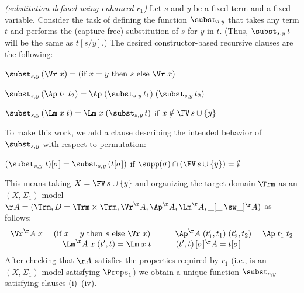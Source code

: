 \begin{exa}\rm
	\textit{(substitution defined using enhanced $r_1$)}  \cite{pitts-AlphaStructural} 
	Let $s$ and $y$ be a fixed term and a fixed variable. 
	Consider the task of defining the function $\subst_{s,y}$ that takes any term $t$ and performs the (capture-free) 
	substitution of $s$ for $y$ in $t$. 
	(Thus, $\subst_{s,y}\,t$ will be the same as $t[s/y]$.)
		The desired constructor-based recursive clauses are the following: 
	\begin{myitem}
		\item[(i)] $\subst_{s,y}\,(\Vr\;x)= (\mbox{if $x=y$ then $s$ else $\Vr\;x$})$
	    \item[(ii)] $\subst_{s,y}\,(\Ap\;t_1\;t_2) = \Ap\;(\subst_{s,y}\,t_1)\;(\subst_{s,y}\,t_2)$
		\item[(iii)] 
		$\subst_{s,y}\,(\Lm\;x\;t) = \Lm\;x\;(\subst_{s,y}\,t)$ if $x\notin \FV\,s \cup \{y\}$ 
	\end{myitem}
	To make this work, %
	we add a clause describing the intended behavior of $\subst_{s,y}$ with respect to permutation: %
	\begin{myitem}
		\item[(iv)] $(\subst_{s,y}\;t)[\sigma] = 
		\subst_{s,y}\,(t[\sigma])$ if $\supp(\sigma) \cap (\FV\,s \cup \{y\})= \emptyset$ 
	\end{myitem}
	
	This means taking $X = \FV\,s \cup \{y\}$ and 
	organizing the target domain 
	$\Trm$ 
	as an $(X,\Sigma_1)$-model 
	$\AA = (\Trm,D = \Trm \times \Trm,\Vr^\AA,\Ap^\AA,\Lm^\AA,\_[\_\,\sw \_]^\AA) %
	$ as follows:
	$$
	\begin{array}{c} 
		\Vr^\AA\;x = (\mbox{if $x=y$ then $s$ else $\Vr\;x$}) \hspace*{7ex}
		\Ap^\AA\;(t_1',t_1)\;(t_2',t_2) = \Ap\;t_1\;t_2 
		\\
		\Lm^\AA\;x\;(t',t) = \Lm\;x\;t
		\hspace*{7ex}
		(t',t)\,[\sigma]^\AA = t[\sigma]
	\end{array}
	$$
	After checking that $\AA$ satisfies the properties required by $r_1$ 
	(i.e., is an $(X,\Sigma_1)$-model satisfying $\Props_1$) %
	we obtain a unique function $\subst_{s,y}$ satisfying clauses (i)--(iv). 
\end{exa}

